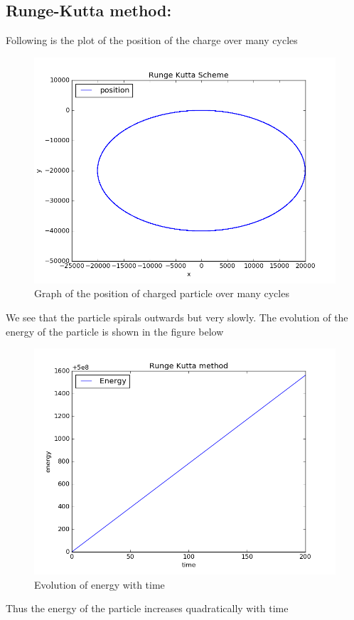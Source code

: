\documentclass[11pt, a4paper]{article}
\begin{document}
\subsection{Runge-Kutta method:}
Following is the plot of the position of the charge over many cycles
\begin{figure}[H]
 \centering
 \includegraphics[scale = 0.5]{RK2_pos_1.png}
 \caption{Graph of the position of charged particle over many cycles}
\end{figure}
We see that the particle spirals outwards but very slowly.
\newpage
The evolution of the energy of the particle is shown in the figure below
\begin{figure}[H]
 \centering
 \includegraphics[scale = 0.5]{RK2_en_1.png}
 \caption{Evolution of energy with time}
\end{figure}
Thus the energy of the particle increases quadratically with time
\end{document}
